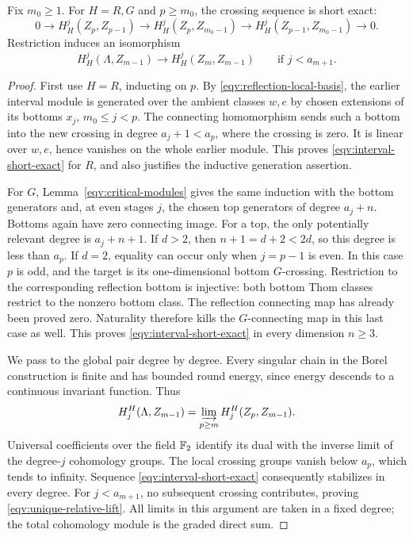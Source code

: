 \begin{lemma}
\label{eqv:interval-collapse}
Fix \(m_0\ge1\).
For \(H=R,G\) and \(p\ge m_0\), the crossing sequence is short exact:
\begin{equation}
 0\longrightarrow H_H^j(Z_p,Z_{p-1})
 \longrightarrow H_H^j(Z_p,Z_{m_0-1})
 \longrightarrow H_H^j(Z_{p-1},Z_{m_0-1})
 \longrightarrow0.
 \label{eqv:interval-short-exact}
\end{equation}
Restriction induces an isomorphism
\begin{equation}
 H_H^j(\Lambda,Z_{m-1})
 \longrightarrow H_H^j(Z_m,Z_{m-1})
 \qquad\text{if }j<a_{m+1}.
 \label{eqv:unique-relative-lift}
\end{equation}
\end{lemma}

\begin{proof}
First use \(H=R\), inducting on \(p\).
By \eqref{eqv:reflection-local-basis}, the earlier interval module
is generated over the ambient classes \(w,e\) by chosen extensions
of its bottoms \(x_j\), \(m_0\le j<p\).
The connecting homomorphism sends such a bottom into the new crossing
in degree \(a_j+1<a_p\), where the crossing is zero.
It is linear over \(w,e\), hence vanishes on the whole earlier module.
This proves \eqref{eqv:interval-short-exact} for \(R\), and also
justifies the inductive generation assertion.

For \(G\), Lemma~\ref{eqv:critical-modules} gives the same induction
with the bottom generators and, at even stages \(j\), the chosen
top generators of degree \(a_j+n\).
Bottoms again have zero connecting image.
For a top, the only potentially relevant degree is \(a_j+n+1\).
If \(d>2\), then \(n+1=d+2<2d\), so this degree is less than \(a_p\).
If \(d=2\), equality can occur only when \(j=p-1\) is even.
In this case \(p\) is odd, and the target is its one-dimensional
bottom \(G\)-crossing.
Restriction to the corresponding reflection bottom is injective:
both bottom Thom classes restrict to the nonzero bottom class.
The reflection connecting map has already been proved zero.
Naturality therefore kills the \(G\)-connecting map in this last
case as well.  This proves \eqref{eqv:interval-short-exact} in every
dimension \(n\ge3\).

We pass to the global pair degree by degree.
Every singular chain in the Borel construction is finite and has
bounded round energy, since energy descends to a continuous invariant
function.  Thus
\[
 H_j^H(\Lambda,Z_{m-1})
 =\varinjlim_{p\ge m}H_j^H(Z_p,Z_{m-1}).
\]
Universal coefficients over the field \(\mathbb F_2\) identify its dual with
the inverse limit of the degree-\(j\) cohomology groups.
The local crossing groups vanish below \(a_p\), which tends to
infinity.  Sequence \eqref{eqv:interval-short-exact} consequently
stabilizes in every degree.
For \(j<a_{m+1}\), no subsequent crossing contributes, proving
\eqref{eqv:unique-relative-lift}.
All limits in this argument are taken in a fixed degree; the total
cohomology module is the graded direct sum.
\end{proof}

